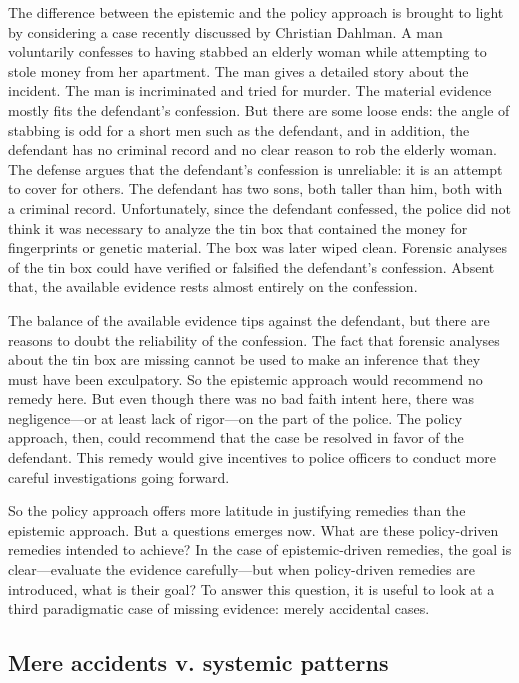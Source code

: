 \documentclass[
  10pt,
  dvipsnames,enabledeprecatedfontcommands]{scrartcl}
\begin{document}
The difference between the epistemic and the policy approach is brought
to light by considering a case recently discussed by Christian Dahlman.
A man voluntarily confesses to having stabbed an elderly woman while
attempting to stole money from her apartment. The man gives a detailed
story about the incident. The man is incriminated and tried for murder.
The material evidence mostly fits the defendant's confession. But there
are some loose ends: the angle of stabbing is odd for a short men such
as the defendant, and in addition, the defendant has no criminal record
and no clear reason to rob the elderly woman. The defense argues that
the defendant's confession is unreliable: it is an attempt to cover for
others. The defendant has two sons, both taller than him, both with a
criminal record. Unfortunately, since the defendant confessed, the
police did not think it was necessary to analyze the tin box that
contained the money for fingerprints or genetic material. The box was
later wiped clean. Forensic analyses of the tin box could have verified
or falsified the defendant's confession. Absent that, the available
evidence rests almost entirely on the confession.

The balance of the available evidence tips against the defendant, but
there are reasons to doubt the reliability of the confession. The fact
that forensic analyses about the tin box are missing cannot be used to
make an inference that they must have been exculpatory. So the epistemic
approach would recommend no remedy here. But even though there was no
bad faith intent here, there was negligence---or at least lack of
rigor---on the part of the police. The policy approach, then, could
recommend that the case be resolved in favor of the defendant. This
remedy would give incentives to police officers to conduct more careful
investigations going forward.

So the policy approach offers more latitude in justifying remedies than
the epistemic approach. But a questions emerges now. What are these
policy-driven remedies intended to achieve? In the case of
epistemic-driven remedies, the goal is clear---evaluate the evidence
carefully---but when policy-driven remedies are introduced, what is
their goal? To answer this question, it is useful to look at a third
paradigmatic case of missing evidence: merely accidental cases.

\hypertarget{mere-accidents-v.-systemic-patterns}{%
\subsection{Mere accidents v. systemic
patterns}\label{mere-accidents-v.-systemic-patterns}}
\end{document}
